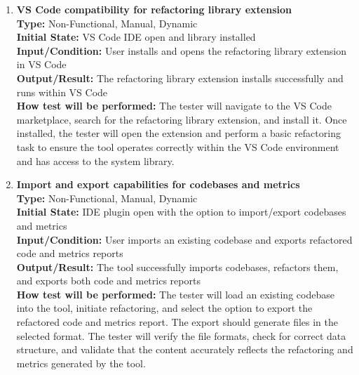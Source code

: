\documentclass[12pt, titlepage]{article}
\begin{document}
  \begin{enumerate}[label={\bf
      \textcolor{Maroon}{test-OPE-\arabic*}}, wide=0pt, font=\itshape]
    \item \textbf{VS Code compatibility for refactoring library
      extension} \\[2mm]
      \textbf{Type:} Non-Functional, Manual, Dynamic \\
      \textbf{Initial State:} VS Code IDE open and library installed\\
      \textbf{Input/Condition:} User installs and opens the
      refactoring library extension in VS Code \\
      \textbf{Output/Result:} The refactoring library extension
      installs successfully and runs within VS Code \\[2mm]
      \textbf{How test will be performed:} The tester will navigate
      to the VS Code marketplace, search for the refactoring library
      extension, and install it. Once installed, the tester will open
      the extension and perform a basic refactoring task to ensure
      the tool operates correctly within the VS Code environment and
      has access to the system library.

    \item \textbf{Import and export capabilities for codebases and
      metrics} \\[2mm]
      \textbf{Type:} Non-Functional, Manual, Dynamic \\
      \textbf{Initial State:} IDE plugin open with the option to
      import/export codebases and metrics \\
      \textbf{Input/Condition:} User imports an existing codebase and
      exports refactored code and metrics reports \\
      \textbf{Output/Result:} The tool successfully imports
      codebases, refactors them, and exports both code and metrics
      reports \\[2mm]
      \textbf{How test will be performed:} The tester will load an
      existing codebase into the tool, initiate refactoring, and
      select the option to export the refactored code and metrics
      report. The export should generate files in the selected
      format. The tester will verify the file formats, check for
      correct data structure, and validate that the content
      accurately reflects the refactoring and metrics generated by the tool.


\end{enumerate}
\end{document}
